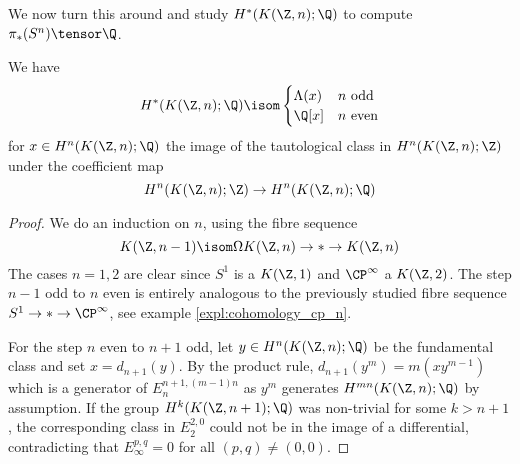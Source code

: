 We now turn this around and study $H^*(K(\Z, n); \Q)$ to compute $\pi_*(S^n) \tensor \Q$.
\begin{proposition}\label{prop:rationalKZncohom}
	We have
	\begin{equation*}
		H^*(K(\Z, n); \Q) \isom \begin{cases}
			\Lambda(x) 	& n \text{ odd} \\
			\Q[x] 		& n \text{ even}
		\end{cases}
	\end{equation*}
	for $x \in H^n(K(\Z, n); \Q)$ the image of the tautological class in $H^n(K(\Z, n); \Z)$ under the coefficient map
	\begin{equation*}
		H^n(K(\Z, n); \Z) \to H^n(K(\Z, n); \Q)
	\end{equation*}
\end{proposition}
\begin{proof}
	We do an induction on $n$, using the fibre sequence
	\begin{equation*}
		K(\Z, n - 1) \isom \Omega K(\Z, n) \to * \to K(\Z, n)
	\end{equation*}
	The cases $n = 1, 2$ are clear since $S^1$ is a $K(\Z, 1)$ and $\CP^\infty$ a $K(\Z, 2)$. 
	The step $n - 1$ odd to $n$ even is entirely analogous to the previously studied fibre sequence $S^1 \to * \to \CP^\infty$, see example \ref{expl:cohomology_cp_n}.

	For the step $n$ even to $n + 1$ odd, let $y \in H^n(K(\Z, n); \Q)$ be the fundamental class and set $x = d_{n + 1}(y)$.
	By the product rule, $d_{n + 1}(y^m) = m (x y^{m - 1})$ which is a generator of $E_n^{n + 1, (m - 1) n}$ as $y^m$ generates $H^{m n}(K(\Z, n); \Q)$ by assumption.
	If the group $H^k(K(\Z, n + 1); \Q)$ was non-trivial for some $k > n + 1$, the corresponding class in $E_2^{2, 0}$ could not be in the image of a differential, contradicting that $E_\infty^{p, q} = 0$ for all $(p, q) \neq (0, 0)$.
\end{proof}
